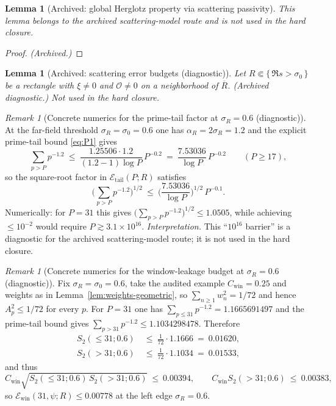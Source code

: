 \documentclass[11pt]{article}
\newtheorem{lemma}[theorem]{Lemma}
\theoremstyle{definition}
\theoremstyle{remark}
\newtheorem{remark}[theorem]{Remark}
\theoremstyle{definition}
\begin{document}
\begin{lemma}[Archived: global Herglotz property via scattering passivity]\label{lem:scattering-herglotz}
This lemma belongs to the archived scattering-model route and is not used in the hard closure.
\end{lemma}
\begin{proof}
\emph{(Archived.)}
\end{proof}

\begin{lemma}[Archived: scattering error budgets (diagnostic)]\label{lem:attachment-error-decomp}
Let $R\Subset\{\,\Re s>\sigma_0\,\}$ be a rectangle with $\xi\neq 0$ and $\mathcal O\neq 0$ on a neighborhood of $\overline R$.
(\emph{Archived diagnostic.}) Not used in the hard closure.
\end{lemma}

\begin{remark}[Concrete numerics for the prime-tail factor at $\sigma_R=0.6$ (diagnostic)]\label{rem:Etail-numerics}
At the far-field threshold $\sigma_R=\sigma_0=0.6$ one has $\alpha_R=2\sigma_R=1.2$ and the explicit prime-tail bound \eqref{eq:P1} gives
\[
  \sum_{p>P}p^{-1.2}\ \le\ \frac{1.25506\cdot 1.2}{(1.2-1)\log P}\,P^{-0.2}
  \ =\ \frac{7.53036}{\log P}\,P^{-0.2}\qquad(P\ge 17),
\]
so the square-root factor in $\mathcal E_{\mathrm{tail}}(P;R)$ satisfies
\[
  \Big(\sum_{p>P}p^{-1.2}\Big)^{1/2}\ \le\
  \Big(\frac{7.53036}{\log P}\Big)^{1/2}\,P^{-0.1}.
\]
Numerically: for $P=31$ this gives $\big(\sum_{p>P}p^{-1.2}\big)^{1/2}\le 1.0505$, while achieving $\le 10^{-2}$ would require $P\gtrsim 3.1\times 10^{16}$.
\smallskip
\noindent\emph{Interpretation.} This ``$10^{16}$ barrier'' is a diagnostic for the archived scattering-model route; it is not used in the hard closure.
\end{remark}

\begin{remark}[Concrete numerics for the window-leakage budget at $\sigma_R=0.6$ (diagnostic)]\label{rem:Ewin-numerics}
Fix $\sigma_R=\sigma_0=0.6$, take the audited example $C_{\mathrm{win}}=0.25$ and weights as in Lemma~\ref{lem:weights-geometric}, so $\sum_{n\ge 1}w_n^2=1/72$ and hence $A_p^2\le 1/72$ for every $p$.
For $P=31$ one has $\sum_{p\le 31}p^{-1.2}=1.1665691497$ and the prime-tail bound gives $\sum_{p>31}p^{-1.2}\le 1.1034298478$. Therefore
\begin{align*}
  S_2(\le 31;0.6)\ &\le\ \tfrac{1}{72}\cdot 1.1666\ =\ 0.01620,\\
  S_2(>31;0.6)\ &\le\ \tfrac{1}{72}\cdot 1.1034\ =\ 0.01533,
\end{align*}
and thus
\[
  C_{\mathrm{win}}\sqrt{S_2(\le 31;0.6)\,S_2(>31;0.6)}\ \le\ 0.00394,\qquad
  C_{\mathrm{win}}S_2(>31;0.6)\ \le\ 0.00383,
\]
so $\mathcal E_{\mathrm{win}}(31,\psi;R)\le 0.00778$ at the left edge $\sigma_R=0.6$.
\end{remark}
\end{document}
